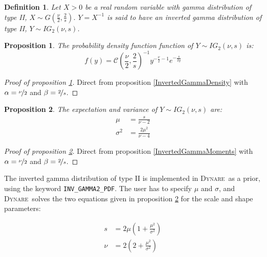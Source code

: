 \documentclass{amsart}
\theoremstyle{plain}
\newtheorem{proposition}{Proposition}[section]
\newtheorem{definition}{Definition}[section]
\theoremstyle{remark}
\numberwithin{equation}{section}
\newcommand{\Dynare}{\textsc{Dynare}}
\begin{document}
\begin{definition}\label{InvertedGamma2}
  Let $X>0$ be a real random variable with gamma distribution of type II,
  $X\sim G\left(\frac{\nu}{2},\frac{2}{s}\right)$. $Y = X^{-1}$ is
  said to have an inverted gamma distribution of type II,
  $Y\sim IG_2(\nu, s)$.
\end{definition}

\begin{proposition}\label{InvertedGamma2Density}
  The probability density function function of $Y\sim IG_2(\nu, s)$ is:
  \[
    f(y) = \mathcal C\left(\frac{\nu}{2}, \frac{2}{s}\right)^{-1}y^{-\frac{\nu}{2}-1}e^{-\frac{s}{2 y}}
  \]
\end{proposition}

\begin{proof}[Proof of proposition \ref{InvertedGamma2Density}]
  Direct from proposition \ref{InvertedGammaDensity} with $\alpha=\nicefrac{\nu}{2}$ and $\beta=\nicefrac{2}{s}$.
\end{proof}

\begin{proposition}\label{InvertedGamma2Moments}
  The expectation and variance of $Y\sim IG_2(\nu, s)$ are:
  \[
    \begin{split}
      \mu &= \frac{s}{\nu-2}\\
      \sigma^2 &= \frac{2\mu^2}{\nu-4}
    \end{split}
  \]
\end{proposition}

\begin{proof}[Proof of proposition \ref{InvertedGamma2Moments}]
  Direct from proposition \ref{InvertedGammaMoments} with $\alpha=\nicefrac{\nu}{2}$ and $\beta=\nicefrac{2}{s}$.
\end{proof}

The inverted gamma distribution of type II is implemented in \Dynare\ as a prior, using the
keyword \verb+INV_GAMMA2_PDF+. The user has to specify $\mu$ and $\sigma$, and \Dynare\ solves the
two equations given in proposition \ref{InvertedGamma2Moments} for the scale and shape parameters:

\begin{equation}
  \begin{split}
    s &= 2\mu\left(1+\frac{\mu^2}{\sigma^2}\right)\\
    \nu &= 2\left(2+\frac{\mu^2}{\sigma^2}\right)
  \end{split}
\end{equation}
\end{document}
